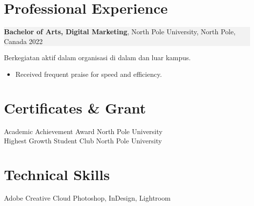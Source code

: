 \documentclass[11pt,a4paper]{article}
\begin{document}
\vspace{0.3em}

\section*{Professional Experience}

\noindent
\setlength{\fboxsep}{0pt}%
\colorbox[HTML]{F2F2F2}{%
  \parbox{\linewidth}{%
    \textbf{Bachelor of Arts, Digital Marketing}, North Pole University, North Pole, Canada \hfill 2022%
  }%
}
\vspace{0.3em}
Berkegiatan aktif dalam organisasi di dalam dan luar kampus.
\begin{itemize}[left=1.5em, noitemsep, topsep=0pt]
    \item Received frequent praise for speed and efficiency.
\end{itemize}

\vspace{0.3em}

\section*{Certificates \& Grant}
Academic Achievement Award \hfill North Pole University\\
Highest Growth Student Club \hfill North Pole University

\vspace{0.3em}

\section*{Technical Skills}
Adobe Creative Cloud Photoshop, InDesign, Lightroom
\end{document}
